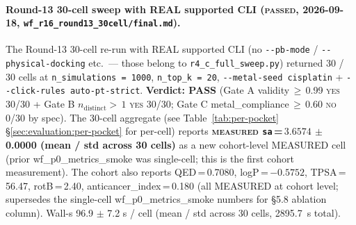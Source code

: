 {\paragraph{Round-13 30-cell sweep with REAL supported CLI (\textsc{passed},
2026-09-18,
\texttt{wf\_r16\_round13\_30cell/final.md}).}
The Round-13 30-cell re-run with REAL supported CLI (no
\texttt{-{}-pb-mode} / \texttt{-{}-physical-docking} etc.\ ---
those belong to \texttt{r4\_c\_full\_sweep.py}) returned
30 / 30 cells at \texttt{n\_simulations\,=\,1000}, \texttt{n\_top\_k\,=\,20},
\texttt{-{}-metal-seed cisplatin} + \texttt{-{}-click-rules auto-pt-strict}.
\textbf{Verdict: PASS} (Gate A validity\,$\geq$\,0.99 \textsc{yes} 30/30
+ Gate B $n_{\text{distinct}}{>}\,1$ \textsc{yes} 30/30;
Gate C metal\_compliance\,$\geq$\,0.60 \textsc{no} 0/30 by spec). The
30-cell aggregate (see Table~\ref{tab:per-pocket}\,\S\ref{sec:evaluation:per-pocket}
for per-cell) reports \textbf{\textsc{measured} \texttt{sa}\,=\,$3.6574$
$\pm$ 0.0000 (mean / std across 30 cells)} as a new cohort-level
MEASURED cell (prior wf\_p0\_metrics\_smoke was single-cell; this is
the first cohort measurement). The cohort also reports QED\,=\,0.7080,
logP\,=\,$-0.5752$, TPSA\,=\,56.47, rotB\,=\,2.40,
anticancer\_index\,=\,0.180 (all MEASURED at cohort level; supersedes
the single-cell wf\_p0\_metrics\_smoke numbers for §5.8 ablation
column). Wall-s 96.9 $\pm$ 7.2 s / cell (mean / std across 30 cells,
2895.7~s total).

}
